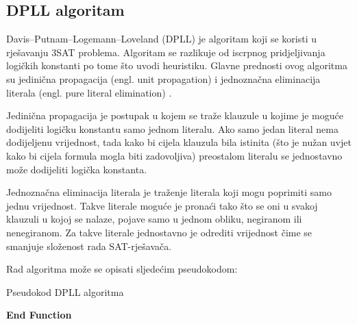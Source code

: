 \documentclass[conference]{IEEEtran}
\begin{document}
\subsection{DPLL algoritam}\label{AA}
Davis–Putnam–Logemann–Loveland (DPLL) je algoritam koji se koristi u rješavanju 3SAT problema. Algoritam se razlikuje od iscrpnog pridjeljivanja logičkih konstanti po tome što uvodi heuristiku. Glavne prednosti ovog algoritma su jedinična propagacija (engl. unit propagation) i jednoznačna eliminacija literala (engl. pure literal elimination) \cite{b2}.

Jedinična propagacija je postupak u kojem se traže klauzule u kojime je moguće dodijeliti logičku konstantu samo jednom literalu. Ako samo jedan literal nema dodijeljenu vrijednost, tada kako bi cijela klauzula bila istinita (što je nužan uvjet kako bi cijela formula mogla biti zadovoljiva) preostalom literalu se jednostavno može dodijeliti logička konstanta.

Jednoznačna eliminacija literala je traženje literala koji mogu poprimiti samo jednu vrijednost. Takve literale moguće je pronaći tako što se oni u svakoj klauzuli u kojoj se nalaze, pojave samo u jednom obliku, negiranom ili nenegiranom. Za takve literale jednostavno je odrediti vrijednost čime se smanjuje složenost rada SAT-rješavača.

Rad algoritma može se opisati sljedećim pseudokodom:

\begin{algorithm}
\caption{Pseudokod DPLL algoritma}\label{alg:one}
\textbf{\newline End Function}
\newline
\end{algorithm}
\end{document}
